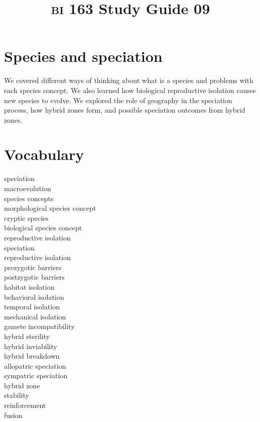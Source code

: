 \documentclass[letterpaper]{tufte-handout}
\title{{\scshape bi} 163 Study Guide 09}
\date{} %
\begin{document}
\maketitle	%

\section*{Species and speciation}

We covered different ways of thinking about what is a species and problems with each species concept. We also learned how biological reproductive isolation causes new species to evolve. We explored the role of geography in the speciation process, how hybrid zones form, and possible speciation outcomes from hybrid zones.

\section*{Vocabulary}

\vspace{-1\baselineskip}
\begin{multicols}{2}
speciation \\
macroevolution \\
species concepts\\
morphological species concept\\
cryptic species\\
biological species concept\\
reproductive isolation \\
speciation \\
reproductive isolation \\
prezygotic barriers \\
postzygotic barriers \\
habitat isolation \\
behavioral isolation \\
temporal isolation \\
mechanical isolation \\
gamete incompatibility \\
hybrid sterility \\
hybrid inviability \\
hybrid breakdown \\
allopatric speciation \\
sympatric speciation \\
hybrid zone \\
stability \\
reinforcement \\
fusion %
\end{multicols}
\end{document}
